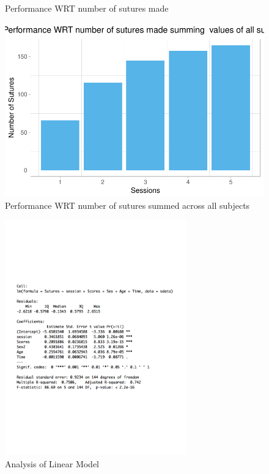 \documentclass[12pt,epsf]{report}
\begin{document}
{\begin{figure}[!htb]
\begin{minipage}[c]{0.5\linewidth}
	\caption{Performance WRT number of sutures made}
	\end{minipage}
	\hfill
	\begin{minipage}[c]{0.5\linewidth}
	\includegraphics[width=\linewidth]{PerformanceWRTSutures_bar.pdf}
	\caption{Performance WRT number of sutures summed across all subjects}
	\end{minipage}
\end{figure}
\begin{figure}[!htb]
	\centering
	\includegraphics[width=0.7\textwidth]{Sutures_Summary.pdf}
	\caption{Analysis of Linear Model}
	\centering
\end{figure}\\
}
\end{document}
